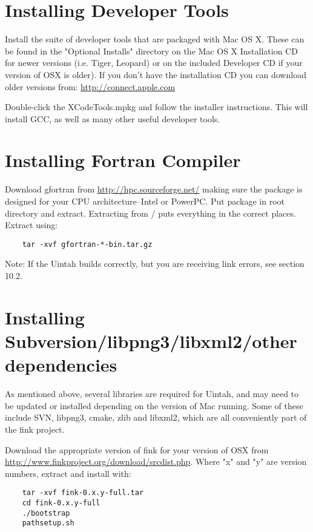\documentclass[11pt,fleqn]{book} %
\begin{document}
\section{Installing Developer Tools}
Install the suite of developer tools that are packaged with Mac OS X.
These can be found in the "Optional Installs" directory on the Mac OS
X Installation CD for newer versions (i.e. Tiger, Leopard) or on the
included Developer CD if your version of OSX is older). If you don't
have the installation CD you can download older versions from:
\url{http://connect.apple.com}

Double-click the XCodeTools.mpkg and follow the installer
instructions.  This will install GCC, as well as many other useful
developer tools.

\section{Installing Fortran Compiler}
Download gfortran from \url{http://hpc.sourceforge.net/} making sure
the package is designed for your CPU architecture--Intel or PowerPC.
Put package in root directory and extract.  Extracting from / puts
everything in the correct places.  Extract using:

\begin{lstlisting}
	tar -xvf gfortran-*-bin.tar.gz
\end{lstlisting}

Note: If the Uintah builds correctly, but you are receiving link errors, see section 10.2.

\section{Installing Subversion/libpng3/libxml2/other dependencies}
As mentioned above, several libraries are required for Uintah, and may
need to be updated or installed depending on the version of Mac
running.  Some of these include SVN, libpng3, cmake, zlib and libxml2,
which are all conveniently part of the fink project.

Download the appropriate version of fink for your version of OSX from
\url{http://www.finkproject.org/download/srcdist.php}.  Where "x" and
"y" are version numbers, extract and install with:

\begin{lstlisting}
	tar -xvf fink-0.x.y-full.tar 
	cd fink-0.x.y-full
	./bootstrap 
	pathsetup.sh
\end{lstlisting}
\end{document}
